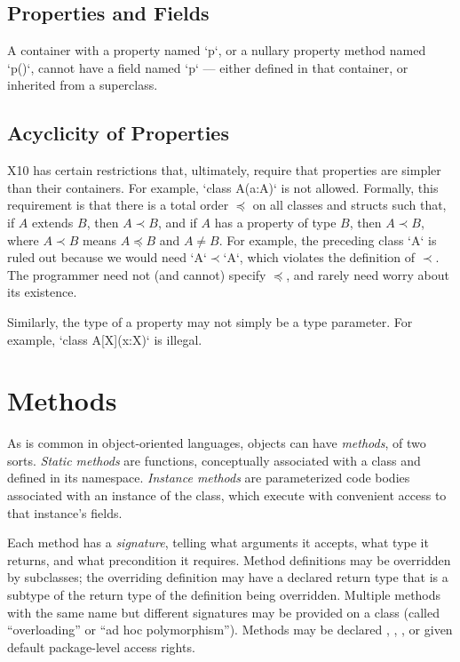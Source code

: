 \subsection{Properties and Fields}

A container with a property named \xcd`p`, or a nullary property method named
\xcd`p()`, cannot have a field named \xcd`p` --- either defined in that
container, or inherited from a superclass.

\subsection{Acyclicity of Properties}

X10 has certain restrictions that, ultimately, require that properties are
simpler than their containers.  For example, \xcd`class A(a:A){}` is not
allowed.  
Formally, this requirement is that there is  a total order $\preceq$ 
on all classes and
structs such that, if $A$ extends $B$, then $A \prec B$, and
if $A$ has a property of type $B$, then $A \prec B$, where $A \prec B$ means
$A \preceq B$ and $A \ne B$.   
For example, the preceding class \xcd`A` is ruled out because we would need
\xcd`A`$\prec$\xcd`A`, which violates the definition of $\prec$.
The programmer need not (and cannot) specify
$\preceq$, and rarely need worry about its existence.  

Similarly, 
the type of a property may not simply be a type parameter.  
For example, \xcd`class A[X](x:X){}` is illegal.





\section{Methods}
\label{sect:Methods}

As is common in object-oriented languages, objects can have {\em methods}, of
two sorts.  {\em Static methods} are functions, conceptually associated with a
class and defined in its namespace.  {\em Instance methods} are parameterized
code bodies associated with an instance of the class, which execute with
convenient access to that instance's fields. 

Each method has a {\em signature}, telling what arguments it accepts, what
type it returns, and what precondition it requires. Method definitions may be
overridden by subclasses; the overriding definition may have a declared return
type that is a subtype of the return type of the definition being overridden.
Multiple methods with the same name but different signatures may be provided
on a class (called ``overloading'' or ``ad hoc polymorphism''). Methods may be
declared , , , or given default package-level access
rights.


